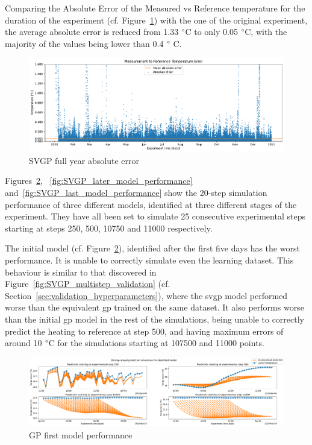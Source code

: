 \clearpage

Comparing the Absolute Error of the Measured vs Reference temperature for the
duration of the experiment (cf. Figure~\ref{fig:SVGP_fullyear_abserr}) with the
one of the original experiment, the average absolute error is reduced from 1.33
$\degree$C to only 0.05 $\degree$C, with the majority of the values being lower
than 0.4 $\degree$ C. 

\begin{figure}[ht]
    \centering
    \includegraphics[width =
    \textwidth]{Plots/1_SVGP_480pts_inf_window_12_averageYear_abserr.pdf}
    \caption{SVGP full year absolute error}
    \label{fig:SVGP_fullyear_abserr}
\end{figure}

Figures~\ref{fig:SVGP_first_model_performance},
~\ref{fig:SVGP_later_model_performance}
and~\ref{fig:SVGP_last_model_performance} show the 20-step simulation performance of three
different models, identified at three different stages of the experiment. They
have all been set to simulate 25 consecutive experimental steps starting at
steps 250, 500, 10750 and 11000 respectively.

The initial model (cf. Figure~\ref{fig:SVGP_first_model_performance}),
identified after the first five days has the worst performance. It is unable to
correctly simulate even the learning dataset. This behaviour is similar to that
discovered in Figure~\ref{fig:SVGP_multistep_validation}
(cf. Section~\ref{sec:validation_hyperparameters}), where the \acrshort{svgp}
model performed worse than the equivalent \acrshort{gp} trained on the same
dataset. It also performs worse than the initial \acrshort{gp} model in the rest
of the simulations, being unable to correctly predict the heating to reference
at step 500, and having maximum errors of around 10 $\degree$C for the simulations
starting at 107500 and 11000 points.

\begin{figure}[ht]
    \centering
    \includegraphics[width =
    \textwidth]{Plots/1_SVGP_480pts_inf_window_12_averageYear_first_model_performance.pdf}
    \caption{GP first model performance}
    \label{fig:SVGP_first_model_performance}
\end{figure}

